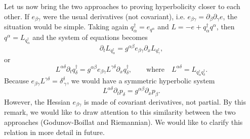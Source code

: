 \documentclass[
10pt, %
a4paper, %
oneside, %
headinclude,footinclude, %
BCOR5mm, %
]{scrartcl}
\newcommand{\MP}[1]{{\color{OliveGreen}MP:\ \ #1}}
\newcommand{\IP}[1]{{\color{Red}IP:\ \ #1}}
\newcommand{\pd}{\partial}
\begin{document}
Let us now bring the two approaches to proving hyperbolicity closer to each other.
If $e_{\beta\gamma}$ were the usual derivatives (not covariant), i.e. $e_{\beta\gamma}=\pd_\beta\pd_\gamma e$, the situation 
would be simple. Taking again $q^\dagger_\alpha = e_{q^\alpha}$ and $L= -e + q^\dagger_\alpha q^\alpha $, then $q^\alpha = 
L_{q^\dagger_\alpha}$ and the system of equations becomes 
\begin{equation}
    \pd_t L_{q^\dagger_\alpha} = g^{\alpha\beta}e_{\beta\gamma}\pd_x L_{q^\dagger_\gamma},
\end{equation}
or
\begin{equation}
    L^{\alpha\delta}\pd_t q^\dagger_\delta = g^{\alpha\beta}e_{\beta\gamma}L^{\gamma\delta}\pd_x q^\dagger_\delta, 
    \qquad\mbox{where}\quad L^{\alpha\delta} = L_{q^\dagger_\alpha q^\dagger_\delta}.
\end{equation}
Because $e_{\beta\gamma}L^{\gamma\delta} = \delta^\delta_{\ \gamma}$, we would have a symmetric hyperbolic system
\begin{equation}
    L^{\alpha\delta}\pd_t p_\delta = g^{\alpha\beta}\pd_x p_\beta.
\end{equation}
However, the Hessian $e_{\beta\gamma}$ is made of covariant derivatives, not partial. By this remark, we 
would like to 
draw attention to this similarity between the two approaches (Godunov-Boillat and Riemannian). We 
would like to clarify this relation in more detail in future. 
%
\end{document}

